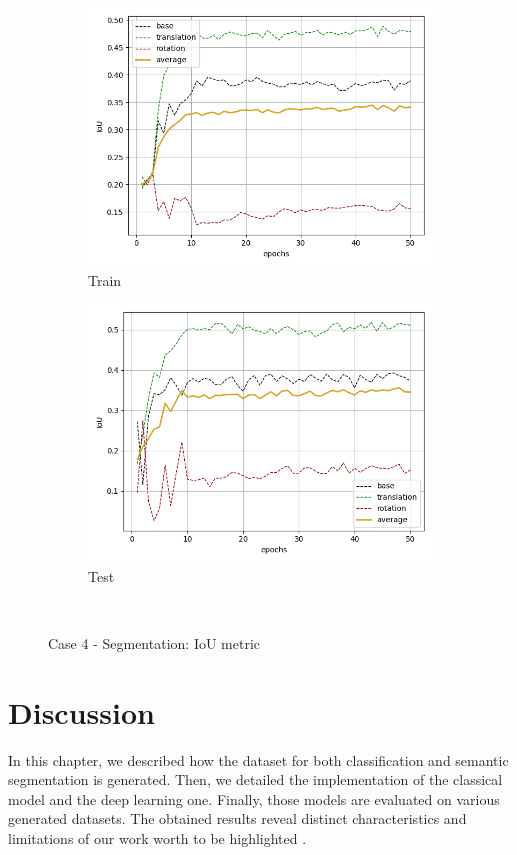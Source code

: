 \begin{figure}[H]
    \begin{subfigure}{.48\linewidth}
    \centering
    \includegraphics[scale=0.45]{Img/seg_flow_noise_train_iou.png}
    \caption{Train}
    \end{subfigure}
    \begin{subfigure}{.48\linewidth}
    \centering
    \includegraphics[scale=0.45]{Img/seg_flow_noise_test_iou.png}
    \caption{Test}
    \end{subfigure}\\
    \caption{Case 4 - Segmentation: IoU metric}
    \label{fig:seg_flow_noise_iou}
\end{figure}
\section{Discussion}
In this chapter, we described how the dataset for both classification and semantic segmentation is generated. Then, we detailed the implementation of the classical model and the deep learning one. Finally, those models are evaluated on various generated datasets. The obtained results reveal distinct characteristics and limitations of our work worth to be highlighted .\\

